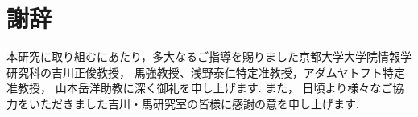 \chapter*{謝辞}

本研究に取り組むにあたり，多大なるご指導を賜りました京都大学大学院情報学研究科の吉川正俊教授，
馬強教授、浅野泰仁特定准教授，アダムヤトフト特定准教授，
山本岳洋助教に深く御礼を申し上げます. 
また， 日頃より様々なご協力をいただきました吉川・馬研究室の皆様に感謝の意を申し上げます.